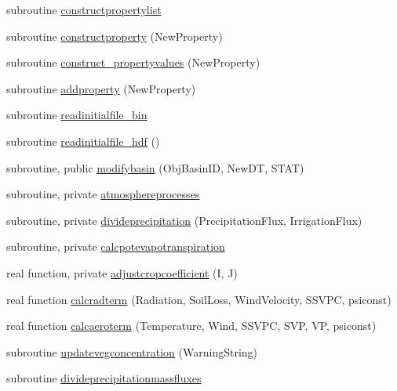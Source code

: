 \begin{DoxyCompactItemize}
\item 
subroutine \mbox{\hyperlink{namespacemodulebasin_a914a8d07507d5ca843132c144c8e61f7}{constructpropertylist}}
\item 
subroutine \mbox{\hyperlink{namespacemodulebasin_afc1a708f812fbecd655d2ec2ec7d7ae7}{constructproperty}} (New\+Property)
\item 
subroutine \mbox{\hyperlink{namespacemodulebasin_a65271cf9b17250a778002a527ee4c253}{construct\+\_\+propertyvalues}} (New\+Property)
\item 
subroutine \mbox{\hyperlink{namespacemodulebasin_ad6d474b32a2a819360f61e25e869f0bd}{addproperty}} (New\+Property)
\item 
subroutine \mbox{\hyperlink{namespacemodulebasin_a4ea226fec981510a8e050dbe3bc285ab}{readinitialfile\+\_\+bin}}
\item 
subroutine \mbox{\hyperlink{namespacemodulebasin_a52545eff06912899ced860eb99799977}{readinitialfile\+\_\+hdf}} ()
\item 
subroutine, public \mbox{\hyperlink{namespacemodulebasin_a5ce7ee123ed0331d3bcb0ba4db4a9797}{modifybasin}} (Obj\+Basin\+ID, New\+DT, S\+T\+AT)
\item 
subroutine, private \mbox{\hyperlink{namespacemodulebasin_a1dc5e66cf881f77967c196e5413f7ff2}{atmosphereprocesses}}
\item 
subroutine, private \mbox{\hyperlink{namespacemodulebasin_a4c084fc559ce2dc2a135a4e171d15024}{divideprecipitation}} (Precipitation\+Flux, Irrigation\+Flux)
\item 
subroutine, private \mbox{\hyperlink{namespacemodulebasin_a112f8b0445f6c2ff174a1292c9efd8c2}{calcpotevapotranspiration}}
\item 
real function, private \mbox{\hyperlink{namespacemodulebasin_af1790be65f99274cd923932448358912}{adjustcropcoefficient}} (I, J)
\item 
real function \mbox{\hyperlink{namespacemodulebasin_ac23d68c52a8a6bf444bd3ade576da5bb}{calcradterm}} (Radiation, Soil\+Loss, Wind\+Velocity, S\+S\+V\+PC, psiconst)
\item 
real function \mbox{\hyperlink{namespacemodulebasin_a466a2ecf0466b641fa24bb3e7847e37d}{calcaeroterm}} (Temperature, Wind, S\+S\+V\+PC, S\+VP, VP, psiconst)
\item 
subroutine \mbox{\hyperlink{namespacemodulebasin_a73f54ad66e54b432898b7261a7ba0969}{updatevegconcentration}} (Warning\+String)
\item 
subroutine \mbox{\hyperlink{namespacemodulebasin_a9ece838b83c6e7f083c271a95dbb460f}{divideprecipitationmassfluxes}}

\end{DoxyCompactItemize}
